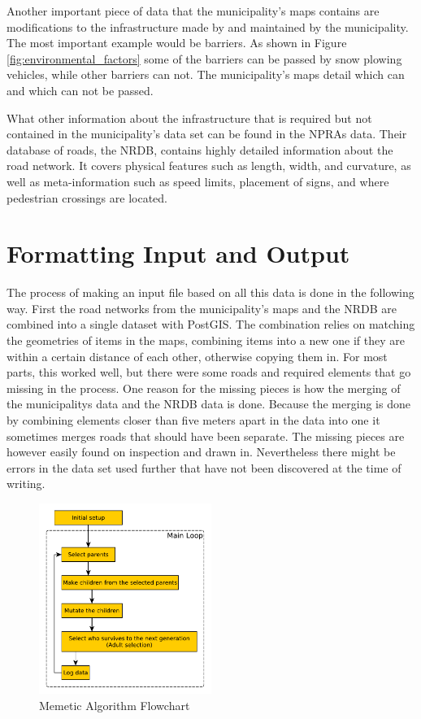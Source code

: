 Another important piece of data that the municipality's maps contains are modifications to the infrastructure made by and maintained by the municipality. The most important example would be barriers. As shown in Figure \ref{fig:environmental_factors} some of the barriers can be passed by snow plowing vehicles, while other barriers can not. The municipality's maps detail which can and which can not be passed.

What other information about the infrastructure that is required but not contained in the municipality's data set can be found in the NPRAs data. Their database of roads, the NRDB, contains highly detailed information about the road network. It covers physical features such as length, width, and curvature, as well as meta-information such as speed limits, placement of signs, and where pedestrian crossings are located.

\section{Formatting Input and Output} %
\label{sec:achitecture_formatting_input_and_output}

The process of making an input file based on all this data is done in the following way. First the road networks from the municipality's maps and the NRDB are combined into a single dataset with PostGIS. The combination relies on matching the geometries of items in the maps, combining items into a new one if they are within a certain distance of each other, otherwise copying them in. For most parts, this worked well, but there were some roads and required elements that go missing in the process. One reason for the missing pieces is how the merging of the municipalitys data and the NRDB data is done. Because the merging is done by combining elements closer than five meters apart in the data into one it sometimes merges roads that should have been separate. The missing pieces are however easily found on inspection and drawn in. Nevertheless there might be errors in the data set used further that have not been discovered at the time of writing.

\begin{figure}
    \begin{center}
        \includegraphics[width=0.5\textwidth]{figures/Architecture/MA_flowchart.pdf}
    \end{center}
    \caption{Memetic Algorithm Flowchart}
    \label{fig:ma_flowchart}
\end{figure}

